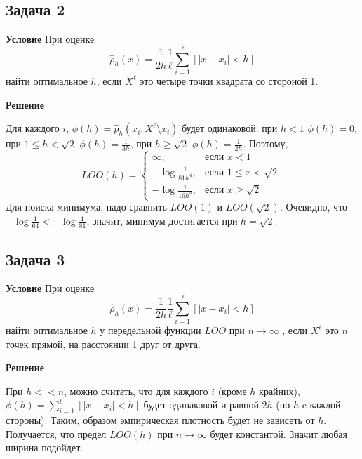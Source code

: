 \subsection*{Задача 2}
\textbf{Условие} 
При оценке
\[
\hat{\rho}_h(x) = \frac{1}{2h} \frac{1}{\ell} \sum_{i=1}^{\ell} \left[ |x - x_i| < h \right]
\]
найти оптимальное $h$, если $X^\ell$ это четыре точки квадрата со стороной 1.

\textbf{Решение} 

Для каждого $i$, $\phi(h) = \hat{p}_h(x_i; X^\ell \setminus x_i)$ будет одинаковой: при $h < 1$ $\phi(h) = 0$, при $1 \leq h < \sqrt{2}$ $\phi(h) = \frac{1}{3h}$, при $h \geq \sqrt{2}$ $\phi(h) = \frac{1}{2h}$. Поэтому, 
\[
LOO(h) = 
\begin{cases} 
\infty, & \text{если } x < 1 \\
-\log{\frac{1}{81h^4}}, & \text{если } 1 \leq x < \sqrt{2} \\
-\log{\frac{1}{16h^4}}, & \text{если } x \geq \sqrt{2} 
\end{cases}
\]
Для поиска минимума, надо сравнить $LOO(1)$ и $LOO(\sqrt{2})$. Очевидно, что $-\log{\frac{1}{64}} < -\log{\frac{1}{81}}$, значит, минимум достигается при $h = \sqrt{2}$.

\subsection*{Задача 3}
\textbf{Условие} 
При оценке
\[
\hat{\rho}_h(x) = \frac{1}{2h} \frac{1}{\ell} \sum_{i=1}^{\ell} \left[ |x - x_i| < h \right]
\]
найти оптимальное $h$ у передельной функции $LOO$ при $n \to \infty$ , если $X^\ell$ это $n$ точек прямой, на расстоянии 1 друг от друга.

\textbf{Решение} 

При $h << n$, можно считать, что для каждого $i$ (кроме $h$ крайних), $\phi(h) = \sum_{i=1}^{\ell} \left[ |x - x_i| < h \right]$ будет одинаковой и равной $2h$ (по $h$ c каждой стороны). Таким, образом эмпирическая плотность будет не зависеть от $h$. Получается, что предел $LOO(h)$ при $n \to \infty$ будет константой. Значит любая ширина подойдет.
